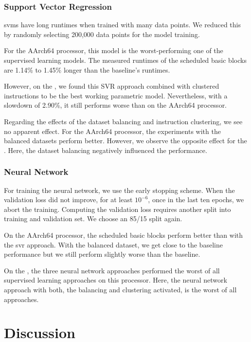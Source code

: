 \subsubsection{Support Vector Regression}
\label{sec:eval:svm}
\acp{svm} have long runtimes when trained with many data points.
We reduced this by randomly selecting 200,000 data points for the model training.

For the AArch64 processor, this model is the worst-performing one of the supervised learning models.
The measured runtimes of the scheduled basic blocks are 1.14\% to 1.45\% longer than the baseline's runtimes.

However, on the \aurora{}, we found this SVR approach combined with clustered instructions to be the best working parametric model.
Nevertheless, with a slowdown of 2.90\%, it still performs worse than on the AArch64 processor.

Regarding the effects of the dataset balancing and instruction clustering, we see no apparent effect.
For the AArch64 processor, the experiments with the balanced datasets perform better.
However, we observe the opposite effect for the \aurora{}.
Here, the dataset balancing negatively influenced the performance.

\subsubsection{Neural Network}
\label{sec:eval:nn}
For training the neural network, we use the early stopping scheme.
When the validation loss did not improve, for at least $10^{-6}$, once in the last ten epochs, we abort the training.
Computing the validation loss requires another split into training and validation set. 
We choose an 85/15 split again.

On the AArch64 processor, the scheduled basic blocks perform better than with the \ac{svr} approach.
With the balanced dataset, we get close to the baseline performance but we still perform slightly worse than the baseline.

On the \aurora{}, the three neural network approaches performed the worst of all supervised learning approaches on this processor.
Here, the neural network approach with both, the balancing and clustering activated, is the worst of all approaches.


\section{Discussion}
\label{sec:eval:discussion}
